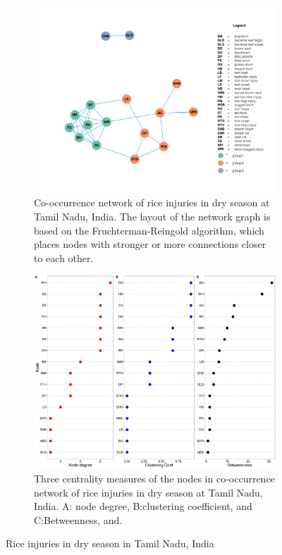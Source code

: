\begin{figure}
    \centering
    \begin{subfigure}[b]{1\textwidth}
        \includegraphics[width = 1\textwidth]{figures/networkTM_ds.pdf}
        \caption{Co-occurrence network of rice injuries in dry season at Tamil Nadu, India. The layout of the network graph is based on the Fruchterman-Reingold algorithm, which places nodes with stronger or more connections closer to each other.}
        \label{fig:networkTM_ds}
    \end{subfigure}
    \begin{subfigure}[b]{1\textwidth}
        \includegraphics[width = 1\textwidth]{figures/nodepropTM_ds.pdf}
        \caption{Three centrality measures of the nodes in co-occurrence network of rice injuries in dry season at Tamil Nadu, India. A: node degree, B:clustering coefficient, and C:Betweenness, and.}
        \label{fig:nodepropTM_ds}
    \end{subfigure}
    \caption{Rice injuries in dry season in Tamil Nadu, India}
    \label{fig:TM_ds}
\end{figure}


